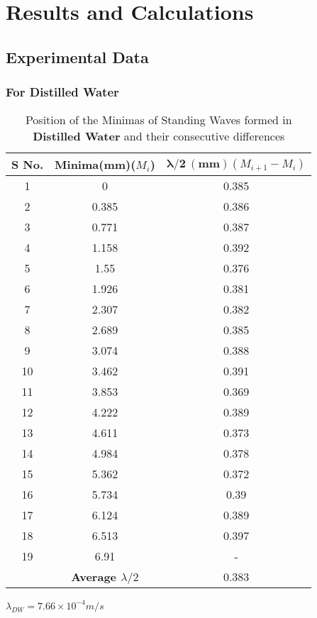 
\chapter{\label{chap:res}Results and Calculations}%


\section{\label{sec:res_fig_plot}Experimental Data}

\subsection{For Distilled Water}
\begin{table}[H]
         \centering
        \begin{tabular}{|c|c|c|}
             \hline
        \textbf{S No.} & \textbf{Minima(mm)($M_i$)} & $\mathbf{\lambda/2\:(mm)}$$(M_{i+1}-M_i)$ \\
        \hline
1&	0&	0.385\\
2&	0.385&	0.386\\
3&	0.771&	0.387\\
4&	1.158&	0.392\\
5&	1.55&	0.376\\
6&	1.926&	0.381\\
7&	2.307&	0.382\\
8&	2.689&	0.385\\
9&	3.074&	0.388\\
10&	3.462&	0.391\\
11&	3.853&	0.369\\
12&	4.222&	0.389\\
13&	4.611&	0.373\\
14&	4.984&	0.378\\
15&	5.362&	0.372\\
16&	5.734&	0.39\\
17&	6.124&	0.389\\
18&	6.513&	0.397\\
19&	6.91&	-\\
        \hline
        &\textbf{Average $\lambda/2$} & 0.383\\
        \hline
    \end{tabular}
    $\lambda_{DW} = 7.66 \times 10^{-4} m/s$
    \caption{Position of the Minimas of Standing Waves formed in \textbf{Distilled Water} and their consecutive differences}
    \end{table}
\pagebreak    
